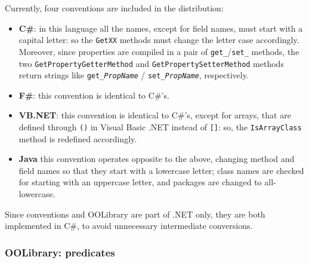 Currently, four conventions are included in the distribution:
\begin{itemize}
  \item \textbf{C\#}: in this language all the names, except for field names, must start with a capital letter: so the \texttt{GetXX} methods must change the letter case accordingly. Moreover, since properties are compiled in a pair of \texttt{get\_}/\texttt{set\_} methods, the two \texttt{GetPropertyGetterMethod} and \texttt{GetPropertySetterMethod} methods return strings like \texttt{get\_\textit{PropName}} / \texttt{set\_\textit{PropName}}, respectively.

  \item \textbf{F\#}: this convention is identical to C\#'s.

  \item \textbf{VB.NET}: this convention is identical to C\#'s, except for arrays, that are defined through \texttt{()} in Visual Basic .NET instead of \texttt{[]}: so, the \texttt{IsArrayClass} method is redefined accordingly.

  \item \textbf{Java} this convention operates opposite to the above, changing method and field names so that they start with a lowercase letter; class names are checked for starting with an uppercase letter, and packages are changed to all-lowercase.
\end{itemize}

\noindent Since conventions and OOLibrary are part of \tuprolog{}.NET only, they are both implemented in C\#, to avoid unnecessary intermediate conversions.

\subsubsection{OOLibrary: predicates}

